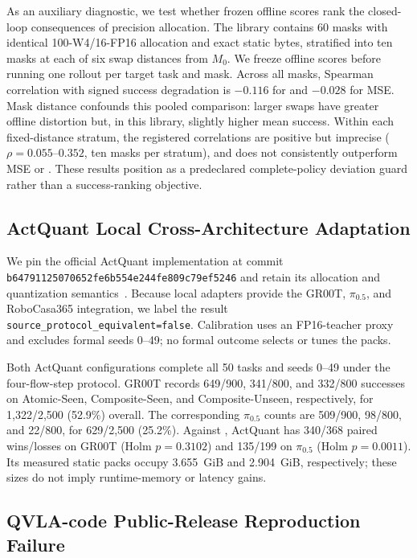 As an auxiliary diagnostic, we test whether frozen offline scores rank the closed-loop consequences of precision allocation. The library contains 60 masks with identical 100-W4/16-FP16 allocation and exact static bytes, stratified into ten masks at each of six swap distances from $M_0$. We freeze offline scores before running one rollout per target task and mask. Across all masks, Spearman correlation with signed success degradation is $-0.116$ for \dpac and $-0.028$ for MSE. Mask distance confounds this pooled comparison: larger swaps have greater offline distortion but, in this library, slightly higher mean success. Within each fixed-distance stratum, the registered \dpac correlations are positive but imprecise ($\rho=0.055$--$0.352$, ten masks per stratum), and \dpac does not consistently outperform MSE or \dfunc. These results position \dpac as a predeclared complete-policy deviation guard rather than a success-ranking objective.

\subsection{ActQuant Local Cross-Architecture Adaptation}
\label{sec:actquant_local}

We pin the official ActQuant implementation at commit \texttt{b64791125070652fe6b554e244fe809c79ef5246} and retain its allocation and quantization semantics~\cite{akbari2026actquant}. Because local adapters provide the GR00T, $\pi_{0.5}$, and RoboCasa365 integration, we label the result \texttt{source\_protocol\_equivalent=false}. Calibration uses an FP16-teacher proxy and excludes formal seeds 0--49; no formal outcome selects or tunes the packs.

Both ActQuant configurations complete all 50 tasks and seeds 0--49 under the four-flow-step protocol. GR00T records 649/900, 341/800, and 332/800 successes on Atomic-Seen, Composite-Seen, and Composite-Unseen, respectively, for 1,322/2,500 (52.9\%) overall. The corresponding $\pi_{0.5}$ counts are 509/900, 98/800, and 22/800, for 629/2,500 (25.2\%). Against \method, ActQuant has 340/368 paired wins/losses on GR00T (Holm $p=0.3102$) and 135/199 on $\pi_{0.5}$ (Holm $p=0.0011$). Its measured static packs occupy 3.655~GiB and 2.904~GiB, respectively; these sizes do not imply runtime-memory or latency gains.

\subsection{QVLA-code Public-Release Reproduction Failure}
\label{sec:qvla_code_failure}

